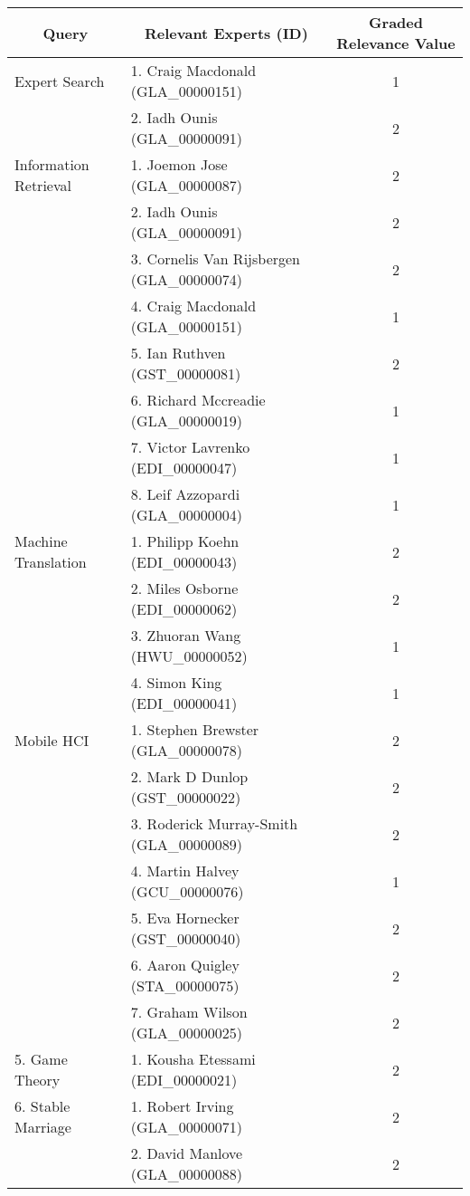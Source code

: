 \footnotesize
\begin{longtable}{|l|l|c|}

\hline \multicolumn{1}{|c|}{\textbf{Query}} & \multicolumn{1}{|c|}{\textbf{Relevant Experts  (ID)}} & \multicolumn{1}{|c|}{\textbf{Graded Relevance Value}} \\

\hline Expert Search & 1. Craig Macdonald (GLA\_00000151)  & 1 \\
\hline  & 2. Iadh Ounis (GLA\_00000091) & 2 \\
\hline Information Retrieval & 1. Joemon Jose (GLA\_00000087) & 2 \\
\hline  & 2. Iadh Ounis (GLA\_00000091)  & 2 \\
\hline  & 3. Cornelis Van Rijsbergen (GLA\_00000074)  & 2 \\
\hline  & 4. Craig Macdonald (GLA\_00000151) & 1 \\
\hline  & 5. Ian Ruthven (GST\_00000081)  & 2 \\
\hline  & 6. Richard Mccreadie (GLA\_00000019) & 1 \\
\hline  & 7. Victor Lavrenko (EDI\_00000047) & 1 \\
\hline  & 8. Leif  Azzopardi (GLA\_00000004) & 1 \\
\hline Machine Translation & 1. Philipp Koehn (EDI\_00000043) & 2 \\
\hline  & 2. Miles Osborne (EDI\_00000062) & 2 \\
\hline  & 3. Zhuoran Wang (HWU\_00000052) & 1 \\
\hline  & 4. Simon King (EDI\_00000041) & 1 \\
\hline Mobile HCI & 1. Stephen Brewster (GLA\_00000078) & 2 \\
\hline  & 2. Mark D Dunlop (GST\_00000022) & 2 \\
\hline  & 3. Roderick Murray-Smith (GLA\_00000089) & 2 \\
\hline  & 4. Martin Halvey (GCU\_00000076) & 1 \\
\hline  & 5. Eva Hornecker (GST\_00000040) & 2 \\
\hline  & 6. Aaron Quigley (STA\_00000075) & 2 \\
\hline  & 7. Graham Wilson (GLA\_00000025) & 2 \\
\hline 5. Game Theory & 1. Kousha Etessami (EDI\_00000021) & 2 \\
\hline 6. Stable Marriage & 1. Robert Irving (GLA\_00000071) & 2 \\
\hline  & 2. David Manlove (GLA\_00000088) & 2 \\

\end{longtable}
